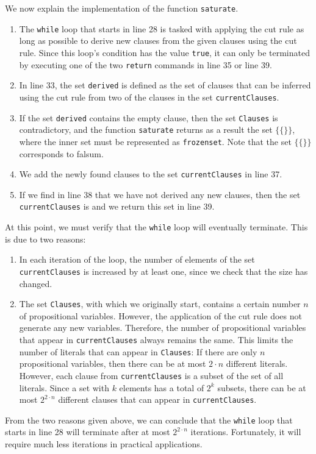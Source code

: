 We now explain the implementation of the function \texttt{saturate}.
\begin{enumerate}
\item The \texttt{while} loop that starts in line 28 is tasked with applying the cut rule
      as long as possible to derive new clauses from the given
      clauses using the cut rule. Since this loop's condition has the value \texttt{true}, it can only be
      terminated by executing one of the two \texttt{return} commands in line 35 or line 39.
\item In line 33, the set \texttt{derived} is defined as the set of clauses that can be inferred using the
      cut rule from two of the clauses in the set \texttt{currentClauses}.
\item If the set \texttt{derived} contains the empty clause, then the set
      \texttt{Clauses} is contradictory, and the function \texttt{saturate} returns as a result the
      set $\bigl\{ \{\} \bigr\}$, where the inner set must be represented as \texttt{frozenset}. Note that the set $\bigl\{ \{\} \bigr\}$ corresponds to falsum.
\item We add the newly found clauses to the set \texttt{currentClauses} in line 37.
\item If we find in line 38 that we have not derived any new clauses,
      then the set \texttt{currentClauses} is  and we return this set in line 39.
\end{enumerate}
At this point, we must verify that the \texttt{while} loop will eventually
terminate. This is due to two reasons:
\begin{enumerate}
\item In each iteration of the loop, the number of elements of the set \texttt{currentClauses}
      is increased by at least one, since we check that the size has changed.
\item The set \texttt{Clauses}, with which we originally start, contains a certain number $n$
      of propositional variables. However, the application of the cut rule does not generate any new
      variables. Therefore, the number of propositional variables that appear in
      \texttt{currentClauses} always remains the same. This limits the number of literals
      that can appear in \texttt{Clauses}: If there are only $n$ propositional variables,
      then there can be at most $2 \cdot n$ different literals.  However, each clause from \texttt{currentClauses} is
      a subset of the set of all literals.  Since a set with $k$ elements has a total of $2^k$
      subsets, there can be at most $2^{2 \cdot n}$ different clauses that can appear in
      \texttt{currentClauses}.
\end{enumerate}
From the two reasons given above, we can conclude that the \texttt{while} loop that starts in
line 28 will terminate after at most $2^{2 \cdot n}$ iterations.  Fortunately, it will require much less
iterations in practical applications.



